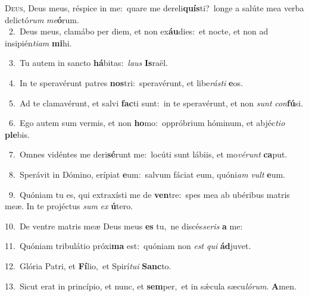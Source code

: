 \lettrine{\initial\textcolor{\initialcolor}{D}}{eus,} Deus meus, réspice in me:~\dagger quare me dereli\-\textbf{quís}\-ti?~\star longe a salúte mea verba delictó\textit{rum} \textit{me}\-\textbf{ó}rum.\\
{\numbfont\textcolor{\numbcolor}{~2.}}~Deus meus, clamábo per diem, et non ex\-\textbf{áu}\-dies:~\star et nocte, et non ad insipién\-\textit{ti}\-\textit{am} \textbf{mi}\-hi.\par
{\numbfont\textcolor{\numbcolor}{~3.}}~Tu autem in sancto \textbf{há}\-bitas:~\star \textit{laus} \textbf{Is}\-raël.\par
{\numbfont\textcolor{\numbcolor}{~4.}}~In te speravérunt patres \textbf{nos}\-tri:~\star speravérunt, et libe\-\textit{rás}\-\textit{ti} \textbf{e}\-os.\par
{\numbfont\textcolor{\numbcolor}{~5.}}~Ad te clamavérunt, et salvi \textbf{fac}\-ti sunt:~\star in te speravérunt, et non \textit{sunt} \textit{con}\-\textbf{fú}si.\par
{\numbfont\textcolor{\numbcolor}{~6.}}~Ego autem sum vermis, et non \textbf{ho}\-mo:~\star oppróbrium hóminum, et abjéc\-\textit{ti}\-\textit{o} \textbf{ple}\-bis.\par
{\numbfont\textcolor{\numbcolor}{~7.}}~Omnes vidéntes me deri\-\textbf{sé}\-runt me:~\star locúti sunt lábiis, et mo\-\textit{vé}\-\textit{runt} \textbf{ca}\-put.\par
{\numbfont\textcolor{\numbcolor}{~8.}}~Sperávit in Dómino, erípiat \textbf{e}\-um:~\star salvum fáciat eum, quóni\textit{am} \textit{vult} \textbf{e}\-um.\par
{\numbfont\textcolor{\numbcolor}{~9.}}~Quóniam tu es, qui extraxísti me de \textbf{ven}\-tre:~\star spes mea ab ubéribus matris meæ. In te projéctus \textit{sum} \textit{ex} \textbf{ú}\-tero.\par
{\numbfont\textcolor{\numbcolor}{10.}}~De ventre matris meæ Deus meus \textbf{es} tu,~\star ne discés\-\textit{se}\-\textit{ris} \textbf{a} me:\par
{\numbfont\textcolor{\numbcolor}{11.}}~Quóniam tribulátio próxi\textbf{ma} est:~\star quóniam non \textit{est} \textit{qui} \textbf{ád}\-juvet.\par
{\numbfont\textcolor{\numbcolor}{12.}}~Glória Patri, et \textbf{Fí}\-lio,~\star et Spirí\-\textit{tu}\-\textit{i} \textbf{Sanc}\-to.\par
{\numbfont\textcolor{\numbcolor}{13.}}~Sicut erat in princípio, et nunc, et \textbf{sem}\-per,~\star et in sǽcula sæcu\-\textit{ló}\-\textit{rum}. \textbf{A}\-men.\par

